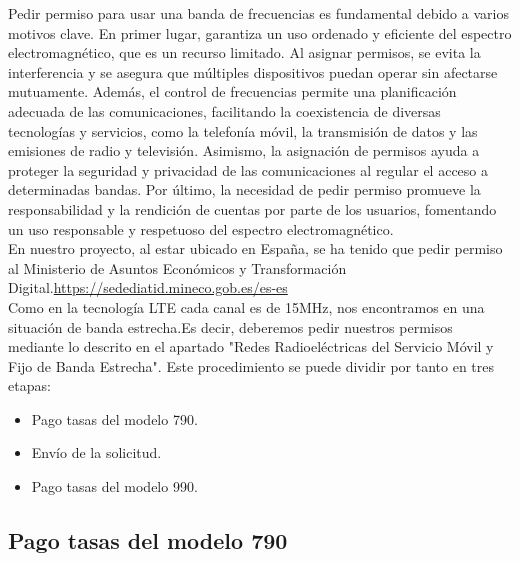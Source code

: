 Pedir permiso para usar una banda de frecuencias es fundamental debido a varios motivos clave. En primer lugar, garantiza un uso ordenado y eficiente del espectro electromagnético, que es un recurso limitado. Al asignar permisos, se evita la interferencia y se asegura que múltiples dispositivos puedan operar sin afectarse mutuamente. Además, el control de frecuencias permite una planificación adecuada de las comunicaciones, facilitando la coexistencia de diversas tecnologías y servicios, como la telefonía móvil, la transmisión de datos y las emisiones de radio y televisión. Asimismo, la asignación de permisos ayuda a proteger la seguridad y privacidad de las comunicaciones al regular el acceso a determinadas bandas. Por último, la necesidad de pedir permiso promueve la responsabilidad y la rendición de cuentas por parte de los usuarios, fomentando un uso responsable y respetuoso del espectro electromagnético.\\

En nuestro proyecto, al estar ubicado en España, se ha tenido que pedir permiso al Ministerio de Asuntos Económicos y Transformación Digital.\url{https://sedediatid.mineco.gob.es/es-es}\\

Como en la tecnología LTE cada canal es de 15MHz, nos encontramos en una situación de banda estrecha.Es decir, deberemos pedir nuestros permisos mediante lo descrito en el apartado "Redes Radioeléctricas del Servicio Móvil y Fijo de Banda Estrecha". Este procedimiento se puede dividir por tanto en tres etapas:

\begin{itemize}
\item Pago tasas del modelo 790.
\item Envío de la solicitud.
\item Pago tasas del modelo 990.
\end{itemize}

\subsection{Pago tasas del modelo 790}

